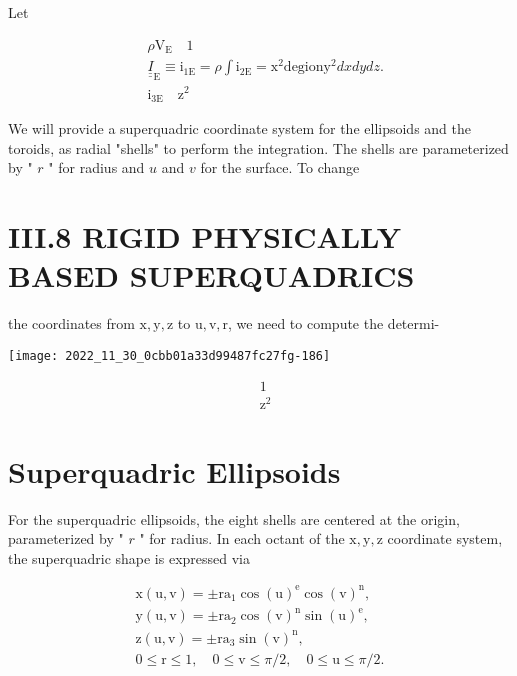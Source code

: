 Let

$$
\begin{aligned}
& \rho \mathrm{V}_{\mathrm{E}} \quad 1 \\
& \underline{\underline{I}}_{\mathrm{E}} \equiv \mathrm{i}_{1 \mathrm{E}}=\rho \int \mathrm{i}_{2 \mathrm{E}}=\mathrm{x}^{2} \mathrm{degion} \mathrm{y}^{2} d x d y d z . \\
& \mathrm{i}_{3 \mathrm{E}} \quad \mathrm{z}^{2}
\end{aligned}
$$

We will provide a superquadric coordinate system for the ellipsoids and the toroids, as radial "shells" to perform the integration. The shells are parameterized by " $r$ " for radius and $u$ and $v$ for the surface. To change

\section{III.8 RIGID PHYSICALLY BASED SUPERQUADRICS}
the coordinates from $\mathrm{x}, \mathrm{y}, \mathrm{z}$ to $\mathrm{u}, \mathrm{v}, \mathrm{r}$, we need to compute the determi-

\begin{center}
\texttt{[image: 2022\_11\_30\_0cbb01a33d99487fc27fg-186]}
\end{center}

$$
\begin{aligned}
& 1 \\
& \mathrm{z}^{2}
\end{aligned}
$$

\section{Superquadric Ellipsoids}
For the superquadric ellipsoids, the eight shells are centered at the origin, parameterized by " $r$ " for radius. In each octant of the $\mathrm{x}, \mathrm{y}, \mathrm{z}$ coordinate system, the superquadric shape is expressed via

$$
\begin{gathered}
\mathrm{x}(\mathrm{u}, \mathrm{v})=\pm \mathrm{ra}_{1} \cos (\mathrm{u})^{\mathrm{e}} \cos (\mathrm{v})^{\mathrm{n}}, \\
\mathrm{y}(\mathrm{u}, \mathrm{v})=\pm \mathrm{ra}_{2} \cos (\mathrm{v})^{\mathrm{n}} \sin (\mathrm{u})^{\mathrm{e}}, \\
\mathrm{z}(\mathrm{u}, \mathrm{v})=\pm \mathrm{ra}_{3} \sin (\mathrm{v})^{\mathrm{n}}, \\
0 \leq \mathrm{r} \leq 1, \quad 0 \leq \mathrm{v} \leq \pi / 2, \quad 0 \leq \mathrm{u} \leq \pi / 2 .
\end{gathered}
$$

